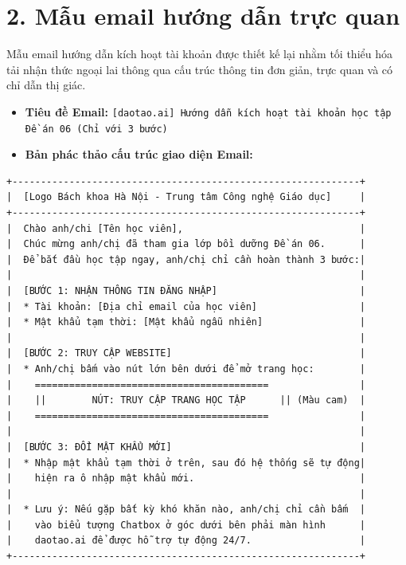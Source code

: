\documentclass[12pt]{article}
\begin{document}
\newpage

\section*{2. Mẫu email hướng dẫn trực quan}

Mẫu email hướng dẫn kích hoạt tài khoản được thiết kế lại nhằm tối thiểu hóa tải nhận thức ngoại lai thông qua cấu trúc thông tin đơn giản, trực quan và có chỉ dẫn thị giác.

\begin{itemize}
    \item \textbf{Tiêu đề Email:} \texttt{[daotao.ai] Hướng dẫn kích hoạt tài khoản học tập Đề án 06 (Chỉ với 3 bước)}
    \item \textbf{Bản phác thảo cấu trúc giao diện Email:}
\end{itemize}

\begingroup
\fontsize{10}{12}\selectfont
\begin{verbatim}
+-------------------------------------------------------------+
|  [Logo Bách khoa Hà Nội - Trung tâm Công nghệ Giáo dục]     |
+-------------------------------------------------------------+
|  Chào anh/chi [Tên học viên],                               |
|  Chúc mừng anh/chị đã tham gia lớp bồi dưỡng Đề án 06.      |
|  Để bắt đầu học tập ngay, anh/chị chỉ cần hoàn thành 3 bước:|
|                                                             |
|  [BƯỚC 1: NHẬN THÔNG TIN ĐĂNG NHẬP]                         |
|  * Tài khoản: [Địa chỉ email của học viên]                  |
|  * Mật khẩu tạm thời: [Mật khẩu ngẫu nhiên]                 |
|                                                             |
|  [BƯỚC 2: TRUY CẬP WEBSITE]                                 |
|  * Anh/chị bấm vào nút lớn bên dưới để mở trang học:        |
|    =========================================                |
|    ||        NÚT: TRUY CẬP TRANG HỌC TẬP      || (Màu cam)  |
|    =========================================                |
|                                                             |
|  [BƯỚC 3: ĐỔI MẬT KHẨU MỚI]                                 |
|  * Nhập mật khẩu tạm thời ở trên, sau đó hệ thống sẽ tự động|
|    hiện ra ô nhập mật khẩu mới.                             |
|                                                             |
|  * Lưu ý: Nếu gặp bất kỳ khó khăn nào, anh/chị chỉ cần bấm  |
|    vào biểu tượng Chatbox ở góc dưới bên phải màn hình      |
|    daotao.ai để được hỗ trợ tự động 24/7.                   |
+-------------------------------------------------------------+
\end{verbatim}
\endgroup
\end{document}
